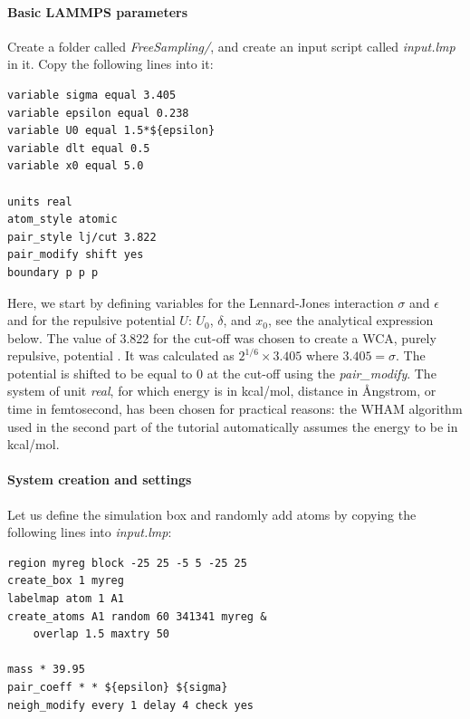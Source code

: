 \documentclass[9pt,tutorial]{livecoms}
\begin{document}
\paragraph{Basic LAMMPS parameters}
\noindent Create a folder called \textit{FreeSampling/}, and create an input
script called \textit{input.lmp} in it. Copy the following lines into it:
\begin{lstlisting}
variable sigma equal 3.405
variable epsilon equal 0.238
variable U0 equal 1.5*${epsilon}
variable dlt equal 0.5
variable x0 equal 5.0

units real
atom_style atomic
pair_style lj/cut 3.822
pair_modify shift yes
boundary p p p
\end{lstlisting}
Here, we start by defining variables for the Lennard-Jones interaction
$\sigma$ and $\epsilon$ and for the repulsive potential $U$: $U_0$, $\delta$, and $x_0$,
see the analytical expression below. The value of 3.822 for the cut-off was chosen to
create a WCA, purely repulsive, potential \cite{weeks1971role}. It was calculated
as $2^{1/6} \times 3.405$ where $3.405 = \sigma$. The potential is shifted to be
equal to 0 at the cut-off using the \textit{pair\_modify}. The system of unit
\textit{real}, for which energy is in kcal/mol, distance in Ångstrom, or time in
femtosecond, has been chosen for practical reasons: the WHAM algorithm used in
the second part of the tutorial automatically assumes the energy to be in kcal/mol.

\paragraph{System creation and settings}
\noindent Let us define the simulation box and randomly add atoms by copying the
following lines into \textit{input.lmp}:
\begin{lstlisting}
region myreg block -25 25 -5 5 -25 25
create_box 1 myreg
labelmap atom 1 A1
create_atoms A1 random 60 341341 myreg &
    overlap 1.5 maxtry 50

mass * 39.95
pair_coeff * * ${epsilon} ${sigma}
neigh_modify every 1 delay 4 check yes
\end{lstlisting}
\end{document}
